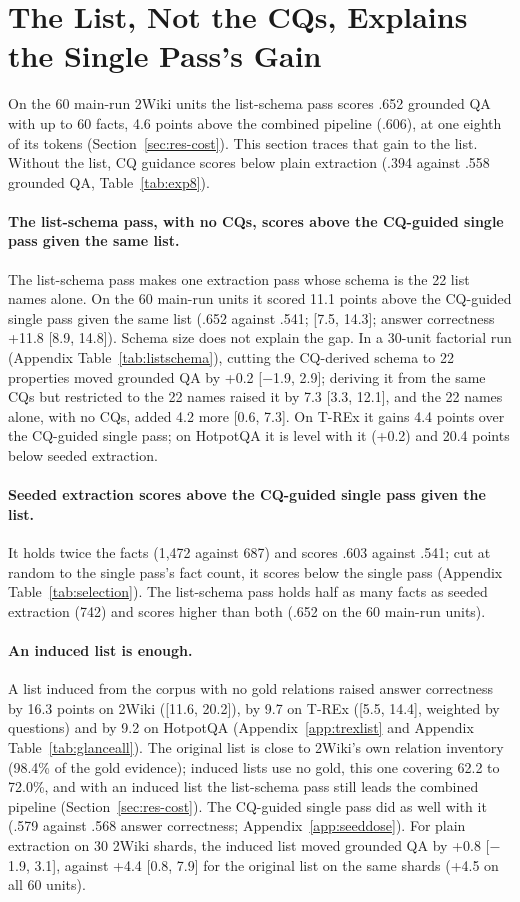 \section{The List, Not the CQs, Explains the Single Pass's Gain}
\label{sec:res-schema}

On the 60 main-run 2Wiki units the list-schema pass scores .652 grounded QA with up to 60 facts, 4.6 points above the combined pipeline (.606), at one eighth of its tokens (Section~\ref{sec:res-cost}). This section traces that gain to the list. Without the list, CQ guidance scores below plain extraction (.394 against .558 grounded QA, Table~\ref{tab:exp8}).
\paragraph{The list-schema pass, with no CQs, scores above the CQ-guided single pass given the same list.}
The list-schema pass makes one extraction pass whose schema is the 22 list names alone. On the 60 main-run units it scored 11.1 points above the CQ-guided single pass given the same list (.652 against .541; [7.5, 14.3]; answer correctness +11.8 [8.9, 14.8]). Schema size does not explain the gap. In a 30-unit factorial run (Appendix Table~\ref{tab:listschema}), cutting the CQ-derived schema to 22 properties moved grounded QA by +0.2 [$-$1.9, 2.9]; deriving it from the same CQs but restricted to the 22 names raised it by 7.3 [3.3, 12.1], and the 22 names alone, with no CQs, added 4.2 more [0.6, 7.3]. On T-REx it gains 4.4 points over the CQ-guided single pass; on HotpotQA it is level with it (+0.2) and 20.4 points below seeded extraction.

\paragraph{Seeded extraction scores above the CQ-guided single pass given the list.}
It holds twice the facts (1,472 against 687) and scores .603 against .541; cut at random to the single pass's fact count, it scores below the single pass (Appendix Table~\ref{tab:selection}). The list-schema pass holds half as many facts as seeded extraction (742) and scores higher than both (.652 on the 60 main-run units).

\paragraph{An induced list is enough.}
A list induced from the corpus with no gold relations raised answer correctness by 16.3 points on 2Wiki ([11.6, 20.2]), by 9.7 on T-REx ([5.5, 14.4], weighted by questions) and by 9.2 on HotpotQA (Appendix~\ref{app:trexlist} and Appendix Table~\ref{tab:glanceall}). The original list is close to 2Wiki's own relation inventory (98.4\% of the gold evidence); induced lists use no gold, this one covering 62.2 to 72.0\%, and with an induced list the list-schema pass still leads the combined pipeline (Section~\ref{sec:res-cost}). The CQ-guided single pass did as well with it (.579 against .568 answer correctness; Appendix~\ref{app:seeddose}). For plain extraction on 30 2Wiki shards, the induced list moved grounded QA by +0.8 [$-$1.9, 3.1], against +4.4 [0.8, 7.9] for the original list on the same shards (+4.5 on all 60 units).

